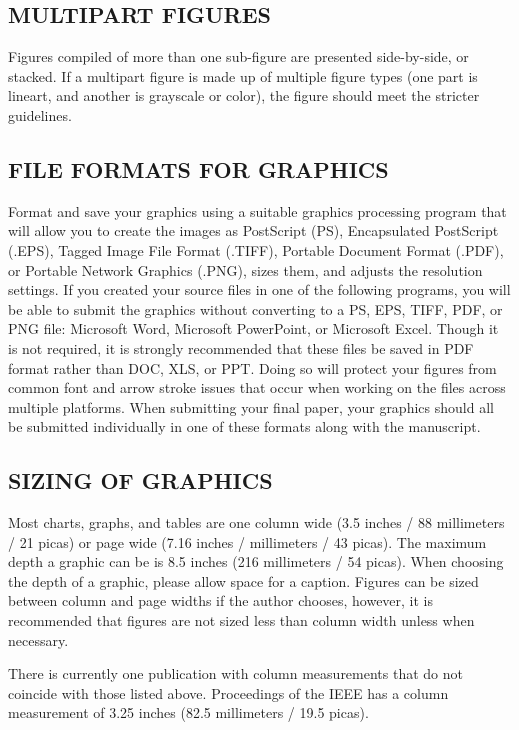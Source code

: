 \documentclass{IEEEojcsys}
\begin{document}
\subsection{MULTIPART FIGURES}

Figures compiled of more than one sub-figure are presented side-by-side, or stacked. If a multipart figure is made up of multiple figure types (one part is lineart, and another is grayscale or color), the figure should meet the stricter guidelines.

\subsection{FILE FORMATS FOR GRAPHICS}

Format and save your graphics using a suitable graphics processing program that will allow you to create the images as PostScript (PS), Encapsulated PostScript (.EPS), Tagged Image File Format (.TIFF), Portable Document Format (.PDF), or Portable Network Graphics (.PNG), sizes them, and adjusts the resolution settings. If you created your source files in one of the following programs, you will be able to submit the graphics without converting to a PS, EPS, TIFF, PDF, or PNG file: Microsoft Word, Microsoft PowerPoint, or Microsoft Excel. Though it is not required, it is strongly recommended that these files be saved in PDF format rather than DOC, XLS, or PPT. Doing so will protect your figures from common font and arrow stroke issues that occur when working on the files across multiple platforms. When submitting your final paper, your graphics should all be submitted individually in one of these formats along with the manuscript.


\subsection{SIZING OF GRAPHICS}

Most charts, graphs, and tables are one column wide (3.5 inches / 88 millimeters / 21 picas) or page wide (7.16 inches / millimeters / 43 picas). The maximum depth a graphic can be is 8.5 inches (216 millimeters / 54 picas). When choosing the depth of a graphic, please allow space for a caption. Figures can be sized between column and page widths if the author chooses, however, it is recommended that figures are not sized less than column width unless when necessary.

There is currently one publication with column measurements that do not coincide with those listed above. Proceedings of the IEEE has a column measurement of 3.25 inches (82.5 millimeters / 19.5 picas). 
\end{document}
